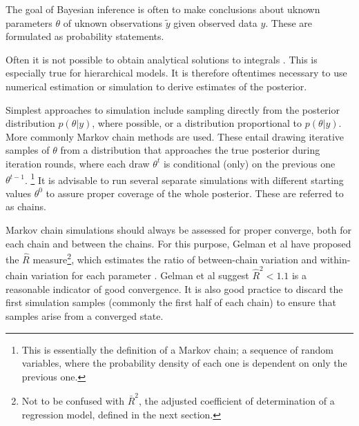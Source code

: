 The goal of Bayesian inference is often to make conclusions about uknown
parameters $\theta$ of uknown observations $\tilde{y}$ given observed data
$y$. These are formulated as probability statements.

Often it is not possible to obtain analytical solutions to integrals
. This is especially true for hierarchical models. It is therefore
oftentimes necessary to use numerical estimation or simulation to
derive estimates of the posterior.



Simplest approaches to simulation include sampling directly from the posterior
distribution $p(\theta|y)$, where possible, or a distribution proportional
to $p(\theta|y)$. More commonly Markov chain methods are used. These entail
drawing iterative samples of $\theta$ from a distribution that approaches
the true posterior during iteration rounds, where each draw $\theta^t$ is
conditional (only) on the previous one $\theta^{t-1}$.
\footnote{This is essentially the definition of a Markov chain; a sequence of random
variables, where the probability density of each one is dependent on only the
previous one.} It is advisable to run several separate simulations with
different starting values $\theta^0$ to assure proper coverage of the whole
posterior. These are referred to as chains.

Markov chain simulations should always be assessed for proper converge, both
for each chain and between the chains. For this purpose, Gelman et al have
proposed the $\hat{R}$ measure\footnote{Not to be confused with $\bar{R}^2$,
the adjusted coefficient of determination of a regression model, defined in
the next section.}, which estimates the ratio of between-chain variation and
within-chain variation for each parameter \citep{Gelman2013}. Gelman et al
suggest $\hat{R}^2 < 1.1$ is a reasonable indicator of good convergence. It is
also good practice to discard the first simulation samples (commonly the first
half of each chain) to ensure that samples arise from a converged state.


